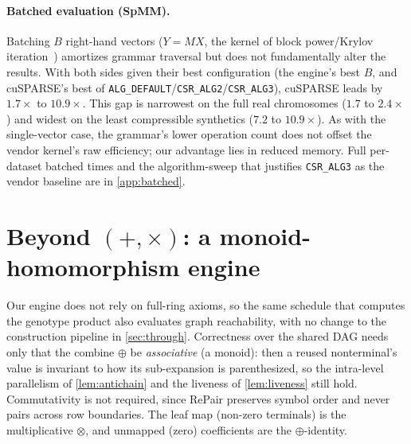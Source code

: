 \documentclass[twoside,leqno,twocolumn]{article}
\begin{document}
\begin{table}[t]
\caption{Genotype right product. Single-vector engine vs.\ cuSPARSE CSR SpMV in unified memory on the GB10 node. $\text{nnz}$: non-zeros; $\text{M}=10^{6}$; $\text{K}=10^{3}$.}
\label{tab:geno}
\centering\footnotesize

\end{table}

\paragraph{Batched evaluation (SpMM).}

Batching $B$ right-hand vectors ($Y=MX$, the kernel of block power/Krylov iteration~\cite[\S7.3, \S10.1, \S10.3.6]{golub-van-loan-matrix-book}) amortizes grammar traversal but does not fundamentally alter the results. With both sides given their best configuration (the engine's best $B$, and cuSPARSE's best of \texttt{ALG\_DEFAULT}/\texttt{CSR\_ALG2}/\texttt{CSR\_ALG3}), cuSPARSE leads by $1.7\times$ to $10.9\times$. This gap is narrowest on the full real chromosomes ($1.7$ to $2.4\times$) and widest on the least compressible synthetics ($7.2$ to $10.9\times$). As with the single-vector case, the grammar's lower operation count does not offset the vendor kernel's raw efficiency; our advantage lies in reduced memory. Full per-dataset batched times and the algorithm-sweep that justifies \texttt{CSR\_ALG3} as the vendor baseline are in \cref{app:batched}.

\section{Beyond $(+,\times)$: a monoid-homomorphism engine}
\label{sec:semiring}

Our engine does not rely on full-ring axioms, so the same schedule that computes the genotype product also evaluates graph reachability, with no change to the construction pipeline in \cref{sec:through}. Correctness over the shared DAG needs only that the combine $\oplus$ be \emph{associative} (a monoid): then a reused nonterminal's value is invariant to how its sub-expansion is parenthesized, so the intra-level parallelism of \cref{lem:antichain} and the liveness of \cref{lem:liveness} still hold. Commutativity is not required, since RePair preserves symbol order and never pairs across row boundaries. The leaf map (non-zero terminals) is the multiplicative $\otimes$, and unmapped (zero) coefficients are the $\oplus$-identity.
\end{document}

